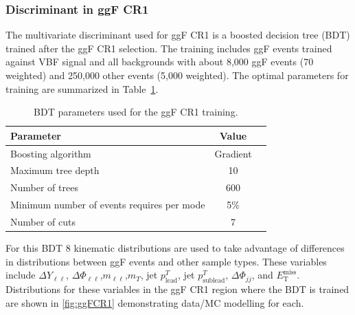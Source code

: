 \subsubsection{Discriminant in ggF CR1}
The multivariate discriminant used for ggF CR1 is a boosted decision tree (BDT) trained after the ggF CR1 selection. The training includes ggF events trained against VBF signal and all backgrounds with about 8,000 ggF events (70 weighted) and 250,000 other events (5,000 weighted). The optimal parameters for training are summarized in Table~\ref{tab:ggFCR1BDTparameters}.
\begin{table}[h!]
\centering
\begin{tabular}{|l|c|c|}
\hline
Parameter                                    & Value     \\
\hline
Boosting algorithm                           & Gradient \\
Maximum tree depth                           &  10      \\
Number of trees                              &  600    \\
Minimum number of events requires per mode   &  5\%     \\ 
Number of cuts                               &  7       \\
\hline
\end{tabular}
\caption{BDT parameters used for the ggF CR1 training.}
\label{tab:ggFCR1BDTparameters}
\end{table}
 
For this BDT 8 kinematic distributions are used to take advantage of differences in distributions between ggF events and other sample types. These variables include $\Delta Y_{\ell\ell}$, $\Delta \Phi_{\ell\ell}$,$m_{\ell\ell}$,$m_T$, jet $p^T_{\text{lead}}$, jet $p^T_{\text{sublead}}$, $\Delta \Phi_{jj}$, and $\ensuremath{E_{\text{T}}^{\text{miss}}}$. Distributions for these variables in the ggF CR1 region where the BDT is trained are shown in \ref{fig:ggFCR1} demonstrating data/MC modelling for each.

